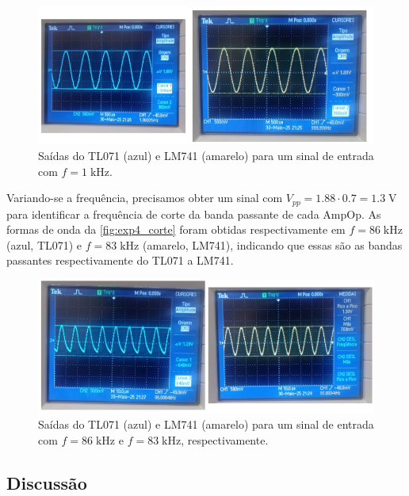\documentclass[
	12pt,				%
	oneside,			%
	a4paper,			%
	chapter=TITLE,
	sumario=tradicional,
	english,			%
	brazil				%
]{abntex2}
\newcommand{\un}[1]{\;\text{#1}}
\begin{document}
\begin{figure}[h!]
	\caption{\label{fig:exp4_1khz} Saídas do TL071 (azul) e LM741 (amarelo) para um sinal de entrada 
    com $f = 1 \un{kHz}$.}
	\begin{center}
    \includegraphics[width=\textwidth,trim=1 1 1 1,clip]{images/Pratica4/exp4_1khz.png}
	\end{center}
\end{figure}

Variando-se a frequência, precisamos obter um sinal com $V_{pp} = 1.88 \cdot 0.7 = 1.3 \un{V}$ 
para identificar a frequência de corte da banda passante de cada AmpOp. As formas de onda da 
\autoref{fig:exp4_corte} foram obtidas respectivamente em $f = 86 \un{kHz}$ (azul, TL071) e 
$f = 83 \un{kHz}$ (amarelo, LM741), indicando que essas são as bandas passantes respectivamente do TL071 a LM741.

\begin{figure}[h!]
	\caption{\label{fig:exp4_corte} Saídas do TL071 (azul) e LM741 (amarelo) para um sinal de entrada 
    com $f = 86 \un{kHz}$ e $f = 83 \un{kHz}$, respectivamente.}
	\begin{center}
    \includegraphics[width=\textwidth,trim=1 1 1 1,clip]{images/Pratica4/exp4_corte.png}
	\end{center}
\end{figure}

\subsection{Discussão}
\end{document}
